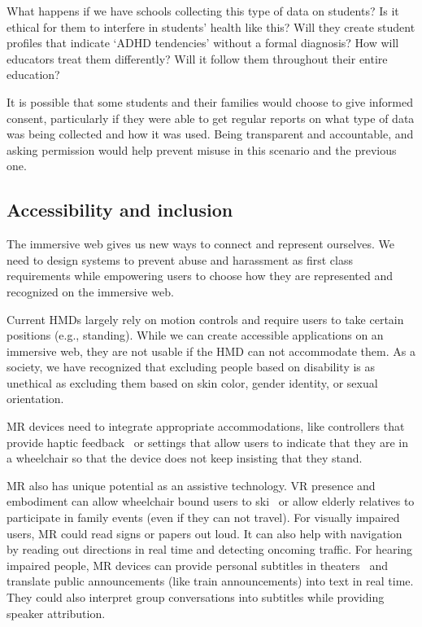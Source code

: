 What happens if we have schools collecting this type of data on students? Is it ethical for them to interfere in students' health like this? Will they create student profiles that indicate `ADHD tendencies' without a formal diagnosis? How will educators treat them differently? Will it follow them throughout their entire education?

It is possible that some students and their families would choose to give informed consent, particularly if they were able to get regular reports on what type of data was being collected and how it was used. Being transparent and accountable, and asking permission would help prevent misuse in this scenario and the previous one.


\subsection{Accessibility and inclusion}

The immersive web gives us new ways to connect and represent ourselves. We need to design systems to prevent abuse and harassment as first class requirements while empowering users to choose how they are represented and recognized on the immersive web.

Current HMDs largely rely on motion controls and require users to take certain positions (e.g., standing). While we can create accessible applications on an immersive web, they are not usable if the HMD can not accommodate them. As a society, we have recognized that excluding people based on disability is as unethical as excluding them based on skin color, gender identity, or sexual orientation.

MR devices need to integrate appropriate accommodations, like controllers that provide haptic feedback~\cite{zhao2018demonstration} or settings that allow users to indicate that they are in a wheelchair so that the device does not keep insisting that they stand.

MR also has unique potential as an assistive technology. VR presence and embodiment can allow wheelchair bound users to ski~\cite{harrell} or allow elderly relatives to participate in family events (even if they can not travel). For visually impaired users, MR could read signs or papers out loud. It can also help with navigation by reading out directions in real time and detecting oncoming traffic. For hearing impaired people, MR devices can provide personal subtitles in theaters~\cite{forrest} and translate public announcements (like train announcements) into text in real time. They could also interpret group conversations into subtitles while providing speaker attribution.

